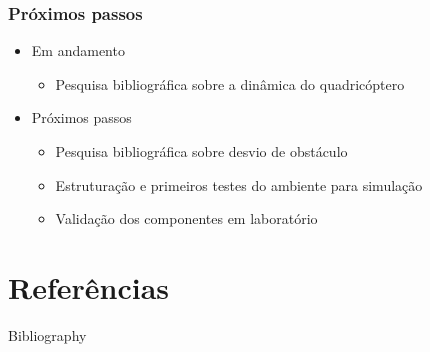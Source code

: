 \documentclass{beamer}
\begin{document}
\begin{frame}
	
	\frametitle{Próximos passos}
	
	\begin{itemize}	
		
		\item Em andamento
		
		\begin{itemize}
			\item Pesquisa bibliográfica sobre a dinâmica do quadricóptero
		\end{itemize}
		
		
		\item Próximos passos
		
		\begin{itemize}
			\item Pesquisa bibliográfica sobre desvio de obstáculo
			
			\item Estruturação e primeiros testes do ambiente para simulação
			
			\item Validação dos componentes em laboratório 
		\end{itemize}
		
	\end{itemize}	
	
	
\end{frame}


\section*{Referências}


\begin{frame}[allowframebreaks]{Bibliography}
	\frametitle{\insertsection}
	
	\footnotesize
\end{frame}


\end{document}
